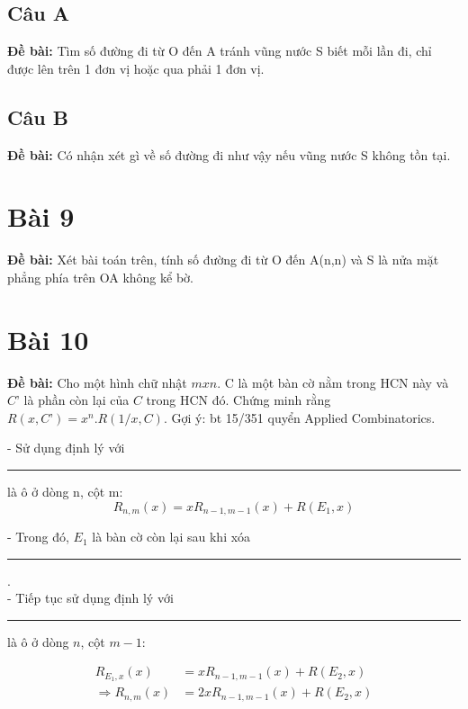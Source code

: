 \documentclass[12pt]{article}
\newcommand\crule[3][black]{\textcolor{#1}{\rule{#2}{#3}}}
\begin{document}
\begin{sloppypar}
\subsection{Câu A}
\begin{tcolorbox}
    \textbf{Đề bài:} Tìm số đường đi từ O đến A tránh vũng nước S biết mỗi lần đi, chỉ được lên trên 1 đơn vị hoặc qua phải 1 đơn vị.
\end{tcolorbox}
\subsection{Câu B}
\begin{tcolorbox}
    \textbf{Đề bài:} Có nhận xét gì về số đường đi như vậy nếu vũng nước S không tồn tại.
\end{tcolorbox}

\section{Bài 9}
\begin{tcolorbox}
    \textbf{Đề bài:} Xét bài toán trên, tính số đường đi từ O đến A(n,n) và S là nửa mặt phẳng phía trên OA không kể bờ.
\end{tcolorbox}

\section{Bài 10}
\begin{tcolorbox}
    \textbf{Đề bài:} Cho một hình chữ nhật \(mxn\). C là một bàn cờ nằm trong HCN này và \(C’\) là phần còn lại của \(C\) trong HCN đó.
    Chứng minh rằng \(R(x,C’)=x^{n} .R(1/x,C)\). Gợi ý: bt 15/351 quyển Applied Combinatorics.
\end{tcolorbox}

- Sử dụng định lý với \crule[cyan]{0.3cm}{0.3cm} là ô ở dòng n, cột m:
\begin{equation*}
    R_{n,m}(x) = xR_{n-1,m-1}(x) + R(E_{1},x)
\end{equation*}

- Trong đó, \(E_{1}\) là bàn cờ còn lại sau khi xóa \crule[cyan]{0.3cm}{0.3cm}. \\
- Tiếp tục sử dụng định lý với \crule[cyan]{0.3cm}{0.3cm} là ô ở dòng \(n\), cột \(m-1\): 

\begin{align*}
    R_{E_{1},x}(x) & = xR_{n-1,m-1}(x) + R(E_{2},x) \\
    \Rightarrow R_{n,m}(x) & = 2xR_{n-1,m-1}(x) + R(E_{2},x) 
\end{align*}


\end{sloppypar}
\end{document}
